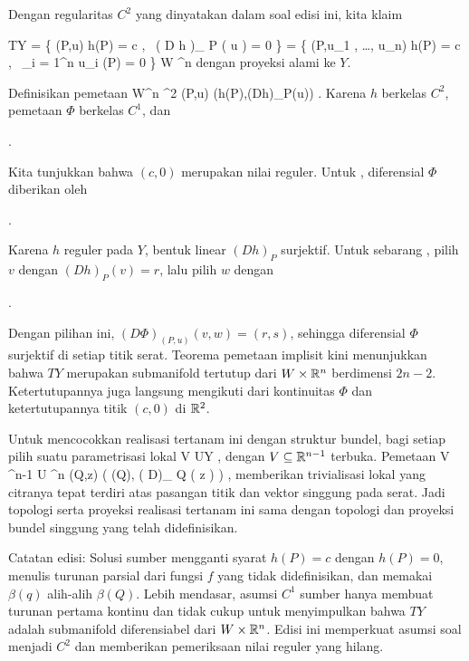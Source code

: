 Dengan regularitas $C^2$ yang dinyatakan dalam soal edisi ini, kita klaim

\mavergleichskettealignhandlinks
{\vergleichskettealignhandlinks
{ TY
}
{ =} { \left\{  (P,u)   \mid   h(P) = c , \,  \left(  D h   \right)_{ P } \left(  u  \right) = 0       \right\}
}
{ =} { \left\{  (P,u_1 , \ldots , u_n)   \mid   h(P) = c , \,  \sum_{i = 1}^n u_i {  } (P) = 0       \right\}
}
{ \subseteq} { W \times \R^n
}
{ } {
}
}
{}
{}{}
dengan proyeksi alami ke $Y$.

Definisikan pemetaan
\maabbeledisp {\Phi} {W\times\R^n} {\R^2
} {(P,u)} {\left(h(P),\left(Dh\right)_P(u)\right)
} {.}
Karena $h$ berkelas $C^2$, pemetaan $\Phi$ berkelas $C^1$, dan

 { . }

Kita tunjukkan bahwa $(c,0)$ merupakan nilai reguler. Untuk
, diferensial $\Phi$ diberikan oleh

 { . }

Karena $h$ reguler pada $Y$, bentuk linear $(Dh)_P$ surjektif. Untuk sebarang
, pilih $v$ dengan $(Dh)_P(v)=r$, lalu pilih $w$ dengan

 { . }

Dengan pilihan ini, $(D\Phi)_{(P,u)}(v,w)=(r,s)$, sehingga diferensial $\Phi$ surjektif di setiap titik serat. Teorema pemetaan implisit kini menunjukkan bahwa $TY$ merupakan submanifold tertutup dari $W\times{\mathbb R}^n$ berdimensi $2n-2$. Ketertutupannya juga langsung mengikuti dari kontinuitas $\Phi$ dan ketertutupannya titik $(c,0)$ di ${\mathbb R}^2$.

Untuk mencocokkan realisasi tertanam ini dengan struktur bundel, bagi setiap
pilih suatu parametrisasi lokal
\maabbdisp {\beta} {V} {U\subseteq Y
} {,}
dengan $V\subseteq{\mathbb R}^{n-1}$ terbuka. Pemetaan
\maabbeledisp {} {V \times \R^{n-1} } { U \times \R^n
} {(Q,z)} { ( \beta(Q), \left(  D\beta  \right)_{ Q } \left(  z  \right) )
} {,}
memberikan trivialisasi lokal yang citranya tepat terdiri atas pasangan titik dan vektor singgung pada serat. Jadi topologi serta proyeksi realisasi tertanam ini sama dengan topologi dan proyeksi bundel singgung yang telah didefinisikan.

Catatan edisi: Solusi sumber mengganti syarat $h(P)=c$ dengan $h(P)=0$, menulis turunan parsial dari fungsi $f$ yang tidak didefinisikan, dan memakai $\beta(q)$ alih-alih $\beta(Q)$. Lebih mendasar, asumsi $C^1$ sumber hanya membuat turunan pertama kontinu dan tidak cukup untuk menyimpulkan bahwa $TY$ adalah submanifold diferensiabel dari $W\times{\mathbb R}^n$. Edisi ini memperkuat asumsi soal menjadi $C^2$ dan memberikan pemeriksaan nilai reguler yang hilang.
